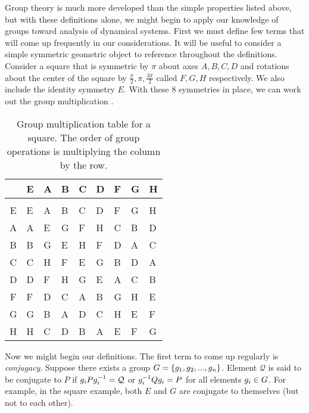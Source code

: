 Group theory is much more developed than the simple properties
listed above, but with these definitions alone, we might begin
to apply our knowledge of groups toward analysis of dynamical
systems.  First we must define few terms that will come up
frequently in our considerations.  It will be useful to
consider a simple symmetric geometric object to reference
throughout the definitions.  Consider a square that is
symmetric  by $\pi$ about axes
$A,B,C,D$ and rotations about the center of the square by
$\frac{\pi}{2},\pi,\frac{3\pi}{2}$ called $F,G,H$ respectively.
We also include the identity symmetry $E$.  With these 8
symmetries in place, we can work out the group multiplication
.
\begin{table}
\caption[]
{Group multiplication table for a square.
The order of group operations is multiplying the
column by the row.}
\centering
{\small
\begin{tabular}{c|llllllll}
  & E & A & B & C & D & F & G & H
\\[1ex]
\hline\\[-0.5ex]
E & E & A & B & C & D & F & G & H \\
A & A & E & G & F & H & C & B & D \\
B & B & G & E & H & F & D & A & C \\
C & C & H & F & E & G & B & D & A \\
D & D & F & H & G & E & A & C & B \\
F & F & D & C & A & B & G & H & E \\
G & G & B & A & D & C & H & E & F \\
H & H & C & D & B & A & E & F & G \\

\end{tabular}
} %
\label{t:squareMultTab} %
\end{table}

Now we might begin our definitions.  The first term to come up
regularly is \textit{conjugacy}.  Suppose there exists a group
$G = \{g_1,g_2,...,g_n\}$. Element $\mathcal{Q}$ is said to be
conjugate to $P$ if $g_iPg_i^{-1} = \mathcal{Q}$ or
$g_i^{-1}Qg_i = P$ for all elements $g_i \in G$.
For
example, in the square example, both $E$ and $G$ are conjugate
to themselves (but not to each other).

